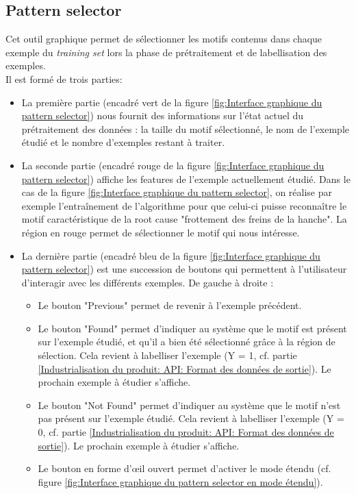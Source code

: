 \subsection{Pattern selector}
\label{Industrialisation du produit: Outils graphiques: Pattern selection}
Cet outil graphique permet de sélectionner les motifs contenus dans chaque exemple du \emph{training set} lors la phase de prétraitement  et de labellisation des exemples. \\
Il est formé de trois parties:
\begin{itemize}
	\item La première partie (encadré vert de la figure \ref{fig:Interface graphique du pattern selector}) nous fournit des informations sur l'état actuel du prétraitement des données : la taille du motif sélectionné, le nom de l'exemple étudié et le nombre d'exemples restant à traiter. 
	\item La seconde partie (encadré rouge de la figure  \ref{fig:Interface graphique du pattern selector}) affiche les features de l'exemple actuellement étudié. Dans le cas de la figure  \ref{fig:Interface graphique du pattern selector}, on réalise par exemple l'entraînement de l'algorithme pour que celui-ci puisse reconnaître le motif caractéristique de la root cause "frottement des freins de la hanche". La région en rouge permet de sélectionner le motif qui nous intéresse.
	\item La dernière partie (encadré bleu de la figure  \ref{fig:Interface graphique du pattern selector}) est une succession de boutons qui permettent à l'utilisateur d'interagir avec les différents exemples. De gauche à droite :   
	\begin{itemize}
		\item Le  bouton "Previous" permet de revenir à l'exemple précédent.
		\item Le bouton "Found" permet d'indiquer au système que le motif est présent sur l'exemple étudié, et qu'il a bien été sélectionné grâce à la région de sélection. Cela revient à labelliser l'exemple (Y = 1, cf. partie \ref{Industrialisation du produit: API: Format des données de sortie}). Le prochain exemple à étudier s'affiche.
		\item Le bouton "Not Found" permet d'indiquer au système que le motif n'est pas présent sur l'exemple étudié. Cela revient à labelliser l'exemple (Y = 0, cf. partie \ref{Industrialisation du produit: API: Format des données de sortie}). Le prochain exemple à étudier s'affiche.
		\item Le bouton en forme d'œil ouvert permet d'activer le mode étendu (cf. figure \ref{fig:Interface graphique du pattern selector en mode étendu}).
	\end{itemize} 
\end{itemize} 

